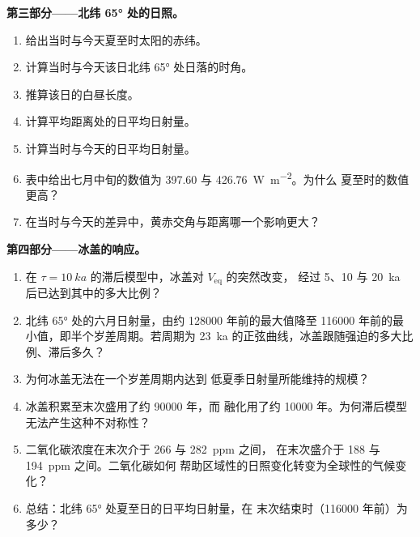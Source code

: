 \begin{problem}
\medskip\noindent\textbf{第三部分——北纬 \ang{65} 处的日照。}
\begin{enumerate}[resume]
  \item 给出当时与今天夏至时太阳的赤纬。
  \item 计算当时与今天该日北纬 \ang{65} 处日落的时角。
  \item 推算该日的白昼长度。
  \item 计算平均距离处的日平均日射量。
  \item 计算当时与今天的日平均日射量。
  \item 表中给出七月中旬的数值为 397.60 与 \qty{426.76}{W.m^{-2}}。为什么
        夏至时的数值更高？
  \item 在当时与今天的差异中，黄赤交角与距离哪一个影响更大？
\end{enumerate}

\medskip\noindent\textbf{第四部分——冰盖的响应。}
\begin{enumerate}[resume]
  \item 在 $\tau = \qty{10}{ka}$ 的滞后模型中，冰盖对 $V_{\mathrm{eq}}$ 的突然改变，
        经过 5、10 与 \qty{20}{ka} 后已达到其中的多大比例？
  \item 北纬 \ang{65} 处的六月日射量，由约 \num{128000} 年前的最大值降至
        \num{116000} 年前的最小值，即半个岁差周期。若周期为
        \qty{23}{ka} 的正弦曲线，冰盖跟随强迫的多大比例、滞后多久？
  \item 为何冰盖无法在一个岁差周期内达到
        低夏季日射量所能维持的规模？
  \item 冰盖积累至末次盛用了约 \num{90000} 年，而
        融化用了约 \num{10000} 年。为何滞后模型无法产生这种不对称性？
  \item 二氧化碳浓度在末次介于 266 与 \qty{282}{ppm} 之间，
        在末次盛介于 188 与 \qty{194}{ppm} 之间。二氧化碳如何
        帮助区域性的日照变化转变为全球性的气候变化？
  \item 总结：北纬 \ang{65} 处夏至日的日平均日射量，在
        末次结束时（\num{116000} 年前）为多少？
\end{enumerate}
\end{problem}
